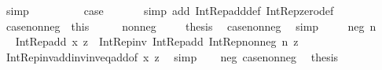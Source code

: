 \begin{isabellebody}
\ simp\isanewline
\ \ \ \ \ \ \isamarkupfalse%
\ \isamarkupfalse%
\ {\isacharquery}{\kern0pt}case\ \isacommand{{\isachardot}{\kern0pt}}\isamarkupfalse%
\isanewline
\ \ \ \ \isamarkupfalse%
\ {\isacharparenleft}{\kern0pt}simp\ add{\isacharcolon}{\kern0pt}\ Int{\isacharunderscore}{\kern0pt}Rep{\isacharunderscore}{\kern0pt}add{\isacharunderscore}{\kern0pt}def\ Int{\isacharunderscore}{\kern0pt}Rep{\isacharunderscore}{\kern0pt}zero{\isacharunderscore}{\kern0pt}def{\isacharparenright}{\kern0pt}\isanewline
\ \ \isacommand{{\isacharbraceright}{\kern0pt}}\isamarkupfalse%
\isanewline
\ \ \isamarkupfalse%
\ case{\isacharunderscore}{\kern0pt}nonneg\ {\isacharequal}{\kern0pt}\ this\isanewline
\ \ \isacommand{{\isacharbraceleft}{\kern0pt}}\isamarkupfalse%
\ \isamarkupfalse%
\ {\isacharparenleft}{\kern0pt}nonneg\ {\isacharunderscore}{\kern0pt}{\isacharparenright}{\kern0pt}\ \isamarkupfalse%
\ \isamarkupfalse%
\ {\isacharquery}{\kern0pt}thesis\ \isamarkupfalse%
\ case{\isacharunderscore}{\kern0pt}nonneg\ \isamarkupfalse%
\ simp\ \isacommand{{\isacharbraceright}{\kern0pt}}\isamarkupfalse%
\isanewline
\ \ \isamarkupfalse%
\ {\isacharparenleft}{\kern0pt}neg\ n{\isacharparenright}{\kern0pt}\isanewline
\ \ \isamarkupfalse%
\ \isamarkupfalse%
\ {\isachardoublequoteopen}Int{\isacharunderscore}{\kern0pt}Rep{\isacharunderscore}{\kern0pt}add\ x\ {\isacharquery}{\kern0pt}z\ {\isacharequal}{\kern0pt}\ Int{\isacharunderscore}{\kern0pt}Rep{\isacharunderscore}{\kern0pt}inv\ {\isacharparenleft}{\kern0pt}Int{\isacharunderscore}{\kern0pt}Rep{\isacharunderscore}{\kern0pt}add\ {\isacharparenleft}{\kern0pt}Int{\isacharunderscore}{\kern0pt}Rep{\isacharunderscore}{\kern0pt}nonneg\ n{\isacharparenright}{\kern0pt}\ {\isacharquery}{\kern0pt}z{\isacharparenright}{\kern0pt}{\isachardoublequoteclose}\isanewline
\ \ \ \ \isamarkupfalse%
\ Int{\isacharunderscore}{\kern0pt}Rep{\isacharunderscore}{\kern0pt}inv{\isacharunderscore}{\kern0pt}add{\isacharunderscore}{\kern0pt}inv{\isacharunderscore}{\kern0pt}inv{\isacharunderscore}{\kern0pt}eq{\isacharunderscore}{\kern0pt}add{\isacharbrackleft}{\kern0pt}of\ x\ {\isacharquery}{\kern0pt}z{\isacharbrackright}{\kern0pt}\ \isamarkupfalse%
\ simp\isanewline
\ \ \isamarkupfalse%
\ neg\ case{\isacharunderscore}{\kern0pt}nonneg\ \isamarkupfalse%
\ {\isacharquery}{\kern0pt}thesis\ \isamarkupfalse%

\end{isabellebody}
